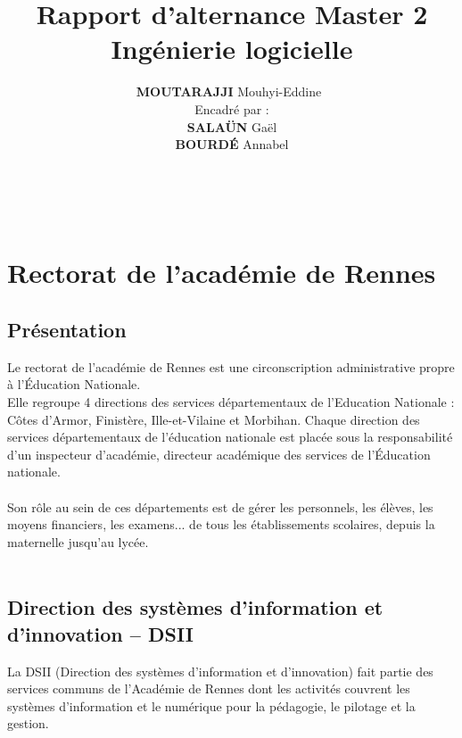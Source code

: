 \documentclass[a4paper]{article}
\title{\textbf{Rapport d'alternance Master 2 Ingénierie logicielle\\ }}
\author{\textbf{MOUTARAJJI} Mouhyi-Eddine\
\\Encadré par :\\\textbf{SALAÜN} Gaël \\\textbf{BOURDÉ} Annabel }
\begin{document}
\date{}




\maketitle

\newpage

\tableofcontents
~
\newpage



\section{Rectorat de l’académie de Rennes} 

\subsection{Présentation}

Le rectorat de l'académie de Rennes est une circonscription administrative propre à
l’Éducation Nationale.\\
Elle regroupe 4 directions des services départementaux de l'Education Nationale : Côtes d'Armor, Finistère, Ille-et-Vilaine et Morbihan. Chaque direction des services départementaux de l'éducation nationale est placée sous la responsabilité d'un inspecteur d'académie, directeur académique des services de l'Éducation nationale.\\\\
Son rôle au sein de ces départements est de gérer les personnels, les élèves, les moyens financiers, les examens... de tous les établissements scolaires, depuis la maternelle jusqu'au lycée.\\\\

\subsection{Direction des systèmes d'information et d'innovation – DSII}

 La DSII (Direction des systèmes d'information et d'innovation) fait partie des services communs de l’Académie de Rennes dont les activités couvrent les systèmes d’information et le numérique pour la pédagogie, le pilotage et la gestion.\\\\
 
\end{document}
